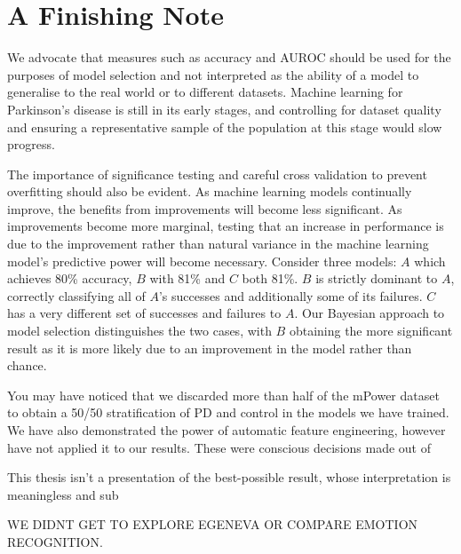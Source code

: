 \documentclass[12pt, twoside]{book}
\begin{document}
\section{A Finishing Note}
We advocate that measures such as accuracy and AUROC should be used for the purposes of model selection and not interpreted as the ability of a model to generalise to the real world or to different datasets. Machine learning for Parkinson's disease is still in its early stages, and controlling for dataset quality and ensuring a representative sample of the population at this stage would slow progress.

The importance of significance testing and careful cross validation to prevent overfitting should also be evident. As machine learning models continually improve, the benefits from improvements will become less significant. As improvements become more marginal, testing that an increase in performance is due to the improvement rather than natural variance in the machine learning model's predictive power will become necessary. Consider three models: $A$ which achieves 80\% accuracy, $B$ with 81\% and $C$ both 81\%. $B$ is strictly dominant to $A$, correctly classifying all of $A$'s successes and additionally some of its failures. $C$ has a very different set of successes and failures to $A$. Our Bayesian approach to model selection distinguishes the two cases, with $B$ obtaining the more significant result as it is more likely due to an improvement in the model rather than chance.



You may have noticed that we discarded more than half of the mPower dataset to obtain a 50/50 stratification of PD and control in the models we have trained. We have also demonstrated the power of automatic feature engineering, however have not applied it to our results. These were conscious decisions made out of 

This thesis isn't a presentation of the best-possible result, whose interpretation is meaningless and sub




WE DIDNT GET TO EXPLORE EGENEVA OR COMPARE EMOTION RECOGNITION.




\backmatter


\end{document}
